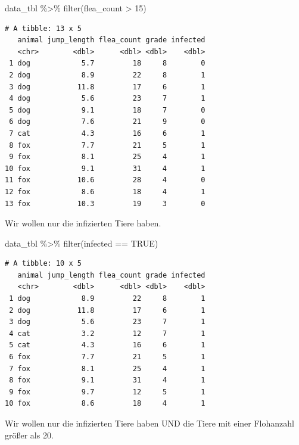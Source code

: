 \documentclass[
  letterpaper,
  DIV=11,
  oneside]{scrreport}
\newenvironment{Shaded}{\begin{snugshade}}{\end{snugshade}}
\newcommand{\ConstantTok}[1]{\textcolor[rgb]{0.56,0.35,0.01}{#1}}
\newcommand{\DecValTok}[1]{\textcolor[rgb]{0.68,0.00,0.00}{#1}}
\newcommand{\FunctionTok}[1]{\textcolor[rgb]{0.28,0.35,0.67}{#1}}
\newcommand{\NormalTok}[1]{\textcolor[rgb]{0.00,0.23,0.31}{#1}}
\newcommand{\SpecialCharTok}[1]{\textcolor[rgb]{0.37,0.37,0.37}{#1}}
\begin{document}
\begin{Shaded}
\begin{Highlighting}[]
\NormalTok{data\_tbl }\SpecialCharTok{\%\textgreater{}\%} 
  \FunctionTok{filter}\NormalTok{(flea\_count }\SpecialCharTok{\textgreater{}} \DecValTok{15}\NormalTok{)}
\end{Highlighting}
\end{Shaded}

\begin{verbatim}
# A tibble: 13 x 5
   animal jump_length flea_count grade infected
   <chr>        <dbl>      <dbl> <dbl>    <dbl>
 1 dog            5.7         18     8        0
 2 dog            8.9         22     8        1
 3 dog           11.8         17     6        1
 4 dog            5.6         23     7        1
 5 dog            9.1         18     7        0
 6 dog            7.6         21     9        0
 7 cat            4.3         16     6        1
 8 fox            7.7         21     5        1
 9 fox            8.1         25     4        1
10 fox            9.1         31     4        1
11 fox           10.6         28     4        0
12 fox            8.6         18     4        1
13 fox           10.3         19     3        0
\end{verbatim}

Wir wollen nur die infizierten Tiere haben.

\begin{Shaded}
\begin{Highlighting}[]
\NormalTok{data\_tbl }\SpecialCharTok{\%\textgreater{}\%} 
  \FunctionTok{filter}\NormalTok{(infected }\SpecialCharTok{==} \ConstantTok{TRUE}\NormalTok{)}
\end{Highlighting}
\end{Shaded}

\begin{verbatim}
# A tibble: 10 x 5
   animal jump_length flea_count grade infected
   <chr>        <dbl>      <dbl> <dbl>    <dbl>
 1 dog            8.9         22     8        1
 2 dog           11.8         17     6        1
 3 dog            5.6         23     7        1
 4 cat            3.2         12     7        1
 5 cat            4.3         16     6        1
 6 fox            7.7         21     5        1
 7 fox            8.1         25     4        1
 8 fox            9.1         31     4        1
 9 fox            9.7         12     5        1
10 fox            8.6         18     4        1
\end{verbatim}

Wir wollen nur die infizierten Tiere haben UND die Tiere mit einer
Flohanzahl größer als 20.
\end{document}
